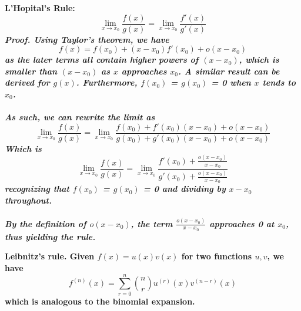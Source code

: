 \documentclass{article}
\begin{document}
\begin{principle}
\bf{L'Hopital's Rule:} 
\begin{equation*}
    \lim_{x \to x_0} \frac{f(x)}{g(x)} = \lim_{x \to x_0} \frac{f'(x)}{g'(x)}  
\end{equation*}
\it{Proof.} \normalfont Using Taylor's theorem, we have 
\begin{equation*}
    f(x) =  f(x_0) + (x-x_0)f'(x_0) +  o(x-x_0)
\end{equation*}
as the later terms all contain higher powers of $(x-x_0)$, which is smaller than $(x-x_0)$ as $x$ approaches $x_0$. A similar result can be derived for $g(x)$.
Furthermore, $f(x_0)$ = $g(x_0)$ = 0 when $x$ tends to $x_0$.
\\
\\
As such, we can rewrite the limit as
\begin{equation*}
    \lim_{x \to x_0} \frac{f(x)}{g(x)} = \lim_{x \to x_0} \frac{f(x_0) + f'(x_0)(x-x_0) + o(x-x_0)}{g(x_0) + g'(x_0)(x-x_0)+o(x-x_0)}  
\end{equation*}
Which is 
\begin{equation*}
    \lim_{x \to x_0} \frac{f(x)}{g(x)} = \lim_{x \to x_0} \frac{f'(x_0) + \frac{o(x-x_0)}{x-x_0}}{g'(x_0) + \frac{o(x-x_0)}{x-x_0}}  
\end{equation*}
recognizing that $f(x_0)$ = $g(x_0)$ = 0 and dividing by $x-x_0$ throughout. 
\\
\\
By the definition of $o(x-x_0)$, the term $\frac{o(x-x_0)}{x-x_0}$ approaches 0 at $x_0$, thus yielding the rule.
\end{principle}
\begin{principle}
\bf Leibnitz's rule. \normalfont Given $f(x) = u(x) v(x)$ for two functions $u, v$, we have
\begin{equation*}
f^{(n)}(x) = \sum_{r=0}^{n} {n \choose r} u^{(r)}(x) v^{(n-r)}(x)
\end{equation*}
which is analogous to the binomial expansion.
\end{principle}
\end{document}
